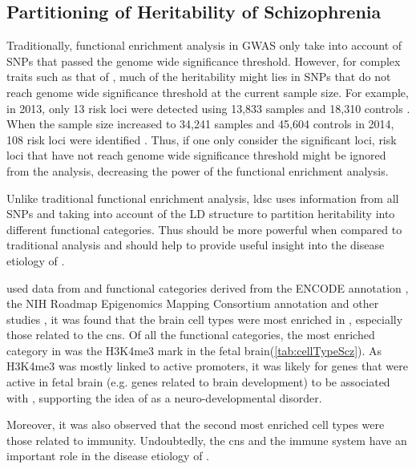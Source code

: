 	\subsection{Partitioning of Heritability of Schizophrenia}
	Traditionally, functional enrichment analysis in \gls{GWAS} only take into account of \glspl{SNP} that passed the genome wide significance threshold. 
	However, for complex traits such as that of , much of the heritability might lies in \glspl{SNP} that do not reach genome wide significance threshold at the current sample size.
	For example, in 2013, only 13 risk loci were detected using 13,833  samples and 18,310 controls \citep{Ripke2013}. 
	When the sample size increased to 34,241  samples and 45,604 controls in 2014, 108 risk loci were identified \citep{Ripke2014}. 
	Thus, if one only consider the significant loci, risk loci that have not reach genome wide significance threshold might be ignored from the analysis, decreasing the power of the functional enrichment analysis.
	
	Unlike traditional functional enrichment analysis, \gls{ldsc} uses information from all \glspl{SNP} and taking into account of the \gls{LD} structure to partition heritability into different functional categories. 
	Thus should be more powerful when compared to traditional analysis and should help to provide useful insight into the disease etiology of .

	\citet{Finucane2015} used data from \citet{Ripke2014} and functional categories derived from the ENCODE annotation \citep{ENCODEProjectConsortium2012}, the NIH Roadmap Epigenomics Mapping Consortium annotation \citep{Bernstein2010} and other studies \citep{Finucane2015}, it was found that the brain cell types were most enriched in , especially those related to the \gls{cns}.
	Of all the functional categories, the most enriched category in  was the H3K4me3 mark in the fetal brain(\cref{tab:cellTypeScz}). 
	As H3K4me3 was mostly linked to active promoters, it was likely for genes that were active in fetal brain (e.g. genes related to brain development) to be associated with , supporting the idea of  as a neuro-developmental disorder. 
	
	Moreover, it was also observed that the second most enriched cell types were those related to immunity.
	Undoubtedly, the \gls{cns} and the immune system have an important role in the disease etiology of . 


